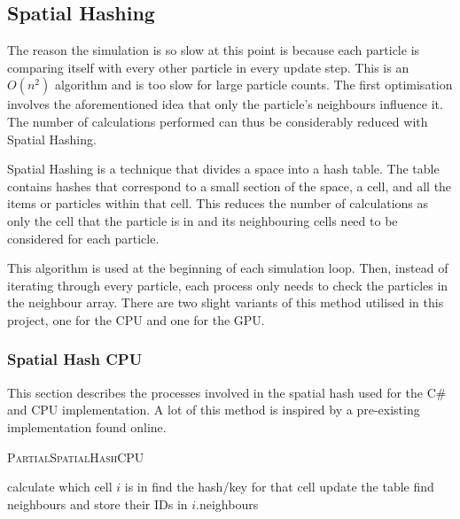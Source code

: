 \documentclass[12pt]{article}
\begin{document}
    \subsection{Spatial Hashing}

    The reason the simulation is so slow at this point is because each particle is comparing itself with every other particle in every update step. This is an $O(n^2)$ algorithm and is too slow for large particle counts. The first optimisation involves the aforementioned idea that only the particle's neighbours influence it. The number of calculations performed can thus be considerably reduced with Spatial Hashing.

    Spatial Hashing is a technique that divides a space into a hash table. The table contains hashes that correspond to a small section of the space, a cell, and all the items or particles within that cell\cite{spatialpython}. This reduces the number of calculations as only the cell that the particle is in and its neighbouring cells need to be considered for each particle. 
    
    This algorithm is used at the beginning of each simulation loop. Then, instead of iterating through every particle, each process only needs to check the particles in the neighbour array. There are two slight variants of this method utilised in this project, one for the CPU and one for the GPU.

    \subsubsection{Spatial Hash CPU}

    This section describes the processes involved in the spatial hash used for the C\# and CPU implementation. A lot of this method is inspired by a pre-existing implementation found online\cite{sphspatialexample}.

    \begin{algorithm}[H]
        \caption{\textsc{PartialSpatialHashCPU}}
    
        \begin{algorithmic}[1]
                \State calculate which cell $i$ is in
                \State find the hash/key for that cell
            \EndFor
                \State update the table
            \EndFor
                \State find neighbours and store their IDs in $i$.neighbours
            \EndFor
        \end{algorithmic}
    \end{algorithm}
\end{document}
